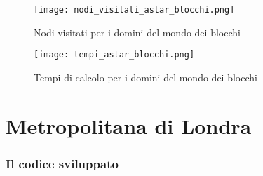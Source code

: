 \begin{figure}[htp]
  \texttt{[image: nodi\_visitati\_astar\_blocchi.png]}
  \caption{Nodi visitati per i domini del mondo dei blocchi}
  \label{fig:figure15}
\end{figure}

\begin{figure}[htp]
  \texttt{[image: tempi\_astar\_blocchi.png]}
  \caption{Tempi di calcolo per i domini del mondo dei blocchi}
  \label{fig:figure16}
\end{figure}

\chapter{Metropolitana di Londra}

\subsection{Il codice sviluppato}

